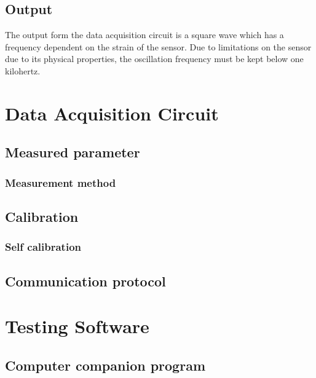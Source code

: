 \subsection{Output}
The output form the data acquisition circuit is a square wave which has a frequency dependent on the strain of the sensor.  Due to limitations on the sensor due to its physical properties, the oscillation frequency must be kept below one kilohertz.  

\section{Data Acquisition Circuit}
\subsection{Measured parameter}
\subsubsection{Measurement method}
\subsection{Calibration}
\subsubsection{Self calibration}
\subsection{Communication protocol}

\section{Testing Software}
\subsection{Computer companion program}


%

